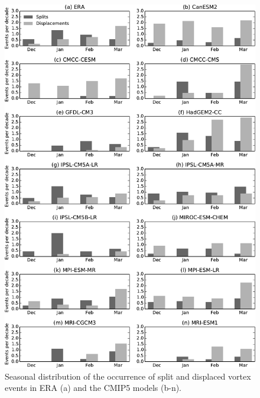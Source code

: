 \begin{figure}
 \centering
 \noindent\includegraphics[width=\textwidth]{figures/chapter-models/events_seasonal.pdf}
 \caption[Seasonal distribution of splits and displacements in the CMIP5
 models]{Seasonal distribution of the occurrence of split and displaced vortex
   events in ERA (a) and the CMIP5 models (b-n).}
 \label{fig:cmip5_events_seasonal}
\end{figure}

